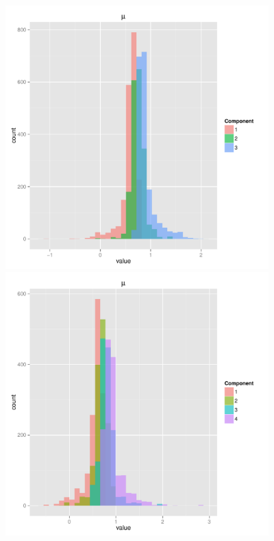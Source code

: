 \documentclass{article}
\begin{document}
\begin{figure}
\begin{minipage}[h!]{0.49\textwidth}
		\includegraphics[width=1\textwidth, height=4in]{muHist3.pdf}
		\includegraphics[width=1\textwidth, height=4in]{muHist4.pdf}	
	\end{minipage}
\end{figure}
\end{document}
